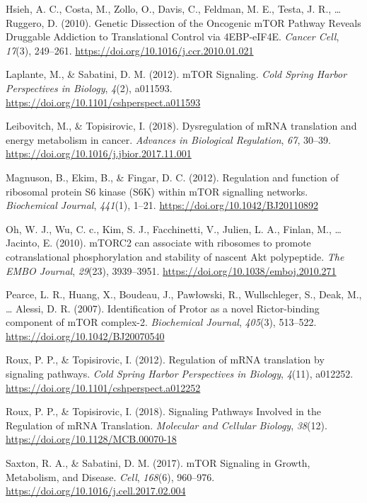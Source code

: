 \documentclass[12pt,openany]{book}
\begin{document}
\hypertarget{ref-Hsieh2010}{}
Hsieh, A. C., Costa, M., Zollo, O., Davis, C., Feldman, M. E., Testa, J.
R., \ldots{} Ruggero, D. (2010). Genetic Dissection of the Oncogenic
mTOR Pathway Reveals Druggable Addiction to Translational Control via
4EBP-eIF4E. \emph{Cancer Cell}, \emph{17}(3), 249--261.
\url{https://doi.org/10.1016/j.ccr.2010.01.021}

\hypertarget{ref-Laplante2012}{}
Laplante, M., \& Sabatini, D. M. (2012). mTOR Signaling. \emph{Cold
Spring Harbor Perspectives in Biology}, \emph{4}(2), a011593.
\url{https://doi.org/10.1101/cshperspect.a011593}

\hypertarget{ref-Leibovitch2018}{}
Leibovitch, M., \& Topisirovic, I. (2018). Dysregulation of mRNA
translation and energy metabolism in cancer. \emph{Advances in
Biological Regulation}, \emph{67}, 30--39.
\url{https://doi.org/10.1016/j.jbior.2017.11.001}

\hypertarget{ref-Magnuson2012}{}
Magnuson, B., Ekim, B., \& Fingar, D. C. (2012). Regulation and function
of ribosomal protein S6 kinase (S6K) within mTOR signalling networks.
\emph{Biochemical Journal}, \emph{441}(1), 1--21.
\url{https://doi.org/10.1042/BJ20110892}

\hypertarget{ref-Oh2010}{}
Oh, W. J., Wu, C. c., Kim, S. J., Facchinetti, V., Julien, L. A.,
Finlan, M., \ldots{} Jacinto, E. (2010). mTORC2 can associate with
ribosomes to promote cotranslational phosphorylation and stability of
nascent Akt polypeptide. \emph{The EMBO Journal}, \emph{29}(23),
3939--3951. \url{https://doi.org/10.1038/emboj.2010.271}

\hypertarget{ref-Pearce2007}{}
Pearce, L. R., Huang, X., Boudeau, J., Pawłowski, R., Wullschleger, S.,
Deak, M., \ldots{} Alessi, D. R. (2007). Identification of Protor as a
novel Rictor-binding component of mTOR complex-2. \emph{Biochemical
Journal}, \emph{405}(3), 513--522.
\url{https://doi.org/10.1042/BJ20070540}

\hypertarget{ref-Roux2012}{}
Roux, P. P., \& Topisirovic, I. (2012). Regulation of mRNA translation
by signaling pathways. \emph{Cold Spring Harbor Perspectives in
Biology}, \emph{4}(11), a012252.
\url{https://doi.org/10.1101/cshperspect.a012252}

\hypertarget{ref-Roux2018}{}
Roux, P. P., \& Topisirovic, I. (2018). Signaling Pathways Involved in
the Regulation of mRNA Translation. \emph{Molecular and Cellular
Biology}, \emph{38}(12). \url{https://doi.org/10.1128/MCB.00070-18}

\hypertarget{ref-Saxton2017}{}
Saxton, R. A., \& Sabatini, D. M. (2017). mTOR Signaling in Growth,
Metabolism, and Disease. \emph{Cell}, \emph{168}(6), 960--976.
\url{https://doi.org/10.1016/j.cell.2017.02.004}
\end{document}
